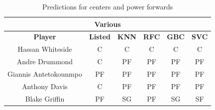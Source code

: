 \documentclass[a4paper]{article}
\begin{document}
\begin{table}[!h]
\begin{center}
\begin{tabular}{|c|c|c|c|c|c|}
\multicolumn{6}{|c|}{\textbf{Various}} \\ \hline
\textbf{Player} & \textbf{Listed} & \textbf{KNN} & \textbf{RFC} & \textbf{GBC} & \textbf{SVC} \\ \hline
Hassan Whiteside & C & C & C & C & C \\ \hline
Andre Drummond & C & PF & PF & PF & PF \\ \hline
Giannis Antetokounmpo & PF & PF & PF & PF & PF \\ \hline
Anthony Davis & C & PF & PF & PF & PF \\ \hline
Blake Griffin & PF & SG & PF & SG & SF \\ \hline
\end{tabular}
\caption{Predictions for centers and power forwards}
\label{tab:pos_clf_c_pf_predictions}
\end{center}
\end{table}
\end{document}
